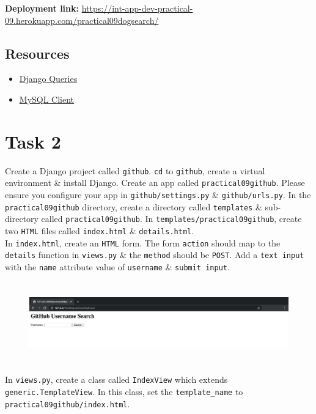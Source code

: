 \documentclass{article}
\begin{document}
\textbf{Deployment link:} \href{https://int-app-dev-practical-09.herokuapp.com/practical09dogsearch/}{https://int-app-dev-practical-09.herokuapp.com/practical09dogsearch/}

\subsection*{Resources} 
\begin{itemize}
  \item \href{https://docs.djangoproject.com/en/3.0/topics/db/queries/}{Django Queries}
  \item \href{https://pypi.org/project/mysqlclient/}{MySQL Client}
\end{itemize}

\section*{Task 2} 
Create a Django project called \texttt{github}. \texttt{cd} to \texttt{github}, create a virtual environment \& install Django. Create an app called \texttt{practical09github}. Please ensure you configure your app in \texttt{github/settings.py} \& \texttt{github/urls.py}. In the \texttt{practical09github} directory, create a directory called \texttt{templates} \& sub-directory called \texttt{practical09github}. In \texttt{templates/practical09github}, create two \texttt{HTML} files called \texttt{index.html} \& \texttt{details.html}. \\

In \texttt{index.html}, create an \texttt{HTML} form. The form \texttt{action} should map to the \texttt{details} function in \texttt{views.py} \& the \texttt{method} should be \texttt{POST}. Add a \texttt{text input} with the \texttt{name} attribute value of \texttt{username} \& \texttt{submit input}. 
\begin{figure}[H]
  \includegraphics[width=175mm, height=35mm]{./img/09-expected-github-1.png}
\end{figure}

In \texttt{views.py}, create a class called \texttt{IndexView} which extends \texttt{generic.TemplateView}. In this class, set the \texttt{template\_name} to \texttt{practical09github/index.html}. \\
\end{document}
